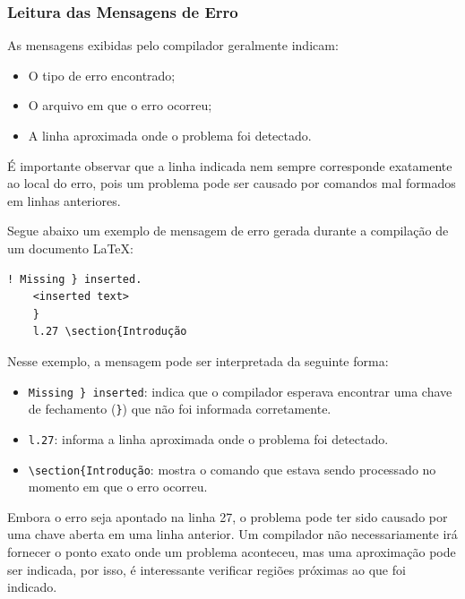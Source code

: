 \documentclass{article}
\begin{document}
\subsubsection{Leitura das Mensagens de Erro}

As mensagens exibidas pelo compilador geralmente indicam:
\begin{itemize}
	\item O tipo de erro encontrado;
	\item O arquivo em que o erro ocorreu;
	\item A linha aproximada onde o problema foi detectado.
\end{itemize}

É importante observar que a linha indicada nem sempre corresponde exatamente ao local do erro, pois um problema pode ser causado por comandos mal formados em linhas anteriores.

Segue abaixo um exemplo de mensagem de erro gerada durante a compilação de um documento \LaTeX\hspace{1pt}:

\begin{lstlisting}[style=latexerror]
	! Missing } inserted.
	<inserted text> 
	}
	l.27 \section{Introdução
\end{lstlisting}

Nesse exemplo, a mensagem pode ser interpretada da seguinte forma:

\begin{itemize}
\item \texttt{Missing \} inserted}: indica que o compilador esperava encontrar uma chave de fechamento (\texttt{\}}) que não foi informada corretamente.
\item \texttt{l.27}: informa a linha aproximada onde o problema foi detectado.
\item \texttt{\textbackslash section\{Introdução}: mostra o comando que estava sendo processado no momento em que o erro ocorreu.
\end{itemize}

Embora o erro seja apontado na linha 27, o problema pode ter sido causado por uma chave aberta em uma linha anterior. Um compilador não necessariamente irá fornecer o ponto exato onde um problema aconteceu, mas uma aproximação pode ser indicada, por isso, é interessante verificar regiões próximas ao que foi indicado.
\end{document}
